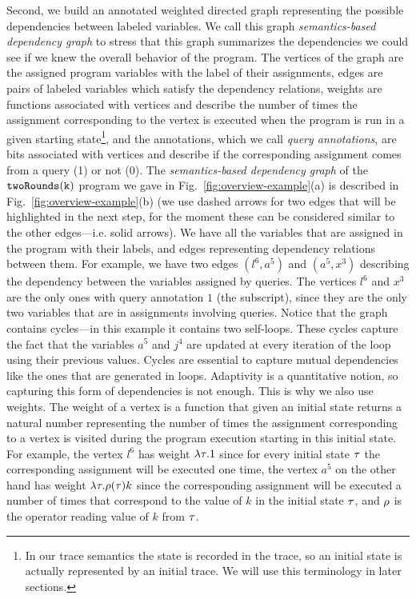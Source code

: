 Second, we build an annotated weighted directed graph representing the possible dependencies between labeled variables. We call this graph \emph{semantics-based dependency graph} to stress that this graph summarizes the dependencies we could see if we knew the overall behavior of the program. 
The vertices of the graph are the assigned program variables with the label of their assignments, edges are pairs of labeled variables which satisfy the dependency relations, weights are functions associated with vertices and describe the number of times the assignment corresponding to the vertex is executed when the program is run in a given starting state\footnote{In our trace semantics the state is recorded in the trace, so an initial state is actually represented by an initial trace. We will use this terminology in later sections.}, and the annotations, which we call \emph{query annotations}, are bits associated with vertices and describe if the corresponding assignment comes from a query (1) or not (0).
The \emph{semantics-based dependency graph} of the $\mathtt{twoRounds(k)}$ program
we gave in Fig.~\ref{fig:overview-example}(a) is described in Fig.~\ref{fig:overview-example}(b) (we use dashed arrows for two edges that will be highlighted in the next step, for the moment these can be considered similar to the other edges---i.e. solid arrows). We have all the variables that are assigned in the program with their labels, and edges representing dependency relations between them. 
For example, we have two edges $(l^6, a^5)$ and $(a^5, x^3)$ describing the dependency between the variables assigned by queries. The vertices $l^6$ and $x^3$ are the only ones with query annotation $1$ (the subscript), since they are the only two variables that are in assignments involving  queries. Notice that the graph contains cycles---in this example it contains two self-loops. These cycles capture the fact that the variables $a^5$ and $j^4$ are updated at every iteration of the loop using their previous values. Cycles are essential to capture mutual dependencies like the ones that are generated in loops. Adaptivity is a quantitative notion, so capturing this form of dependencies is not enough. This is why we also use weights. The weight of a vertex is a function that given an initial state returns a natural number representing 
the number of times the assignment corresponding to a vertex is visited during the program execution starting in this initial state.  
For example, the vertex $l^{6}$ has weight {$\lambda \mathtt{\tau}.1$} since for every initial state {$\mathtt{\tau}$} the corresponding assignment will be executed one time, the vertex $a^5$ on the other hand has weight {$\lambda \mathtt{\tau}. \rho(\mathtt{\tau}) k$ since the corresponding assignment will be executed a number of times that correspond to the value of $k$ in the initial state $\mathtt{\tau}$, and $\rho$ is the operator reading value of $k$ from $\mathtt{\tau}$.
}

